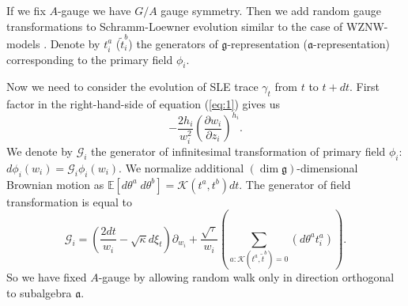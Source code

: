 \documentclass{jetpl}
\newcommand{\gf}{\mathfrak{g}}
\newcommand{\af}{\mathfrak{a}}
\begin{document}
 If we fix $A$-gauge we have $G/A$ gauge symmetry. Then we add random gauge transformations to Schramm-Loewner evolution \cite{2011arXiv1112.4354N} similar to the case of WZNW-models \cite{bettelheim2005stochastic}.  Denote by $t^{a}_{i}$ ($\tilde{t}^{b}_{i}$) the  generators of $\gf$-representation ($\af$-representation) corresponding to the primary field $\phi_{i}$.

Now we need to consider the evolution of SLE trace $\gamma_{t}$ from  $t$ to $t+ dt$. First factor in the right-hand-side of equation (\ref{eq:1}) gives us
\begin{equation*}
  -\frac{2h_{i}}{w_{i}^{2}}\left(\frac{\partial w_{i}}{\partial z_{i}}\right)^{h_{i}}.
\end{equation*}
We denote by $\mathcal{G}_{i}$ the generator of infinitesimal transformation of primary field $\phi_{i}$:$d\phi_{i}(w_{i}) = \mathcal{G}_{i}\phi_{i}(w_{i})$. We normalize additional $\left(\dim\gf\right)$-dimensional Brownian motion as $\mathbb  {E}\left[d\theta^{a}\; d\theta^{b}\right]=\mathcal{K}(t^{a},t^{b})dt$. The generator of field transformation is equal to
\begin{equation}
  \mathcal{G}_{i}=\left(\frac{2dt}{w_{i}}-\sqrt{\kappa} d\xi_{t}\right) \partial_{w_{i}}+\frac{\sqrt{\tau}}{w_{i}}\left(\sum_{a:\mathcal{K}(t^{a},\tilde{t}^{b})=0}\left(d \theta ^{a} t^{a}_{i}\right)\right).
\label{eq:3}
\end{equation}
So we have fixed $A$-gauge by allowing random walk only in direction orthogonal to subalgebra $\af$. 
\end{document}
